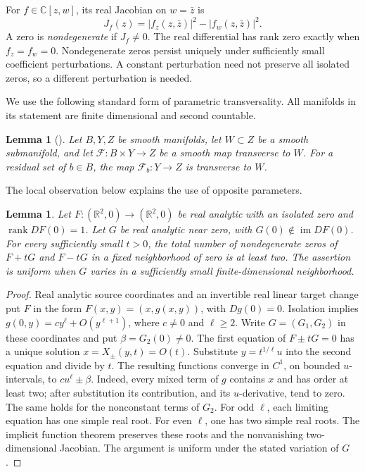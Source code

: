 \documentclass[a4paper]{amsart}
\newtheorem{lem}[thm]{Lemma}
\theoremstyle{remark}
\newcommand{\C}{\mathbb C}
\newcommand{\R}{\mathbb R}
\DeclareMathOperator{\rank}{rank}
\begin{document}
For \(f\in\C[z,w]\), its real Jacobian on \(w=\bar z\) is
\begin{equation}\label{eq:jacobian}
 J_f(z)=|f_z(z,\bar z)|^2-|f_w(z,\bar z)|^2.
\end{equation}
A zero is \emph{nondegenerate} if \(J_f\ne0\).
The real differential has rank zero exactly when \(f_z=f_w=0\).
Nondegenerate zeros persist uniquely under sufficiently small
coefficient perturbations. A constant perturbation need not
preserve all isolated zeros, so a different perturbation is needed.

We use the following standard form of parametric transversality.
All manifolds in its statement are finite dimensional and
second countable.

\begin{lem}[{\cite[Chapter 3, Section 2]{Hir76}}]\label{lem:transversality}
Let \(B,Y,Z\) be smooth manifolds, let \(W\subset Z\) be a
smooth submanifold, and let \(\mathcal F:B\times Y\to Z\)
be a smooth map transverse to \(W\).
For a residual set of \(b\in B\), the map
\(\mathcal F_b:Y\to Z\) is transverse to \(W\).
\end{lem}

The local observation below explains the use of opposite parameters.

\begin{lem}\label{lem:rankone}
Let \(F:(\R^2,0)\to(\R^2,0)\) be real analytic with an
isolated zero and \(\rank DF(0)=1\).
Let \(G\) be real analytic near zero, with
\(G(0)\notin\operatorname{im}DF(0)\).
For every sufficiently small \(t>0\), the total number of
nondegenerate zeros of \(F+tG\) and \(F-tG\) in a fixed
neighborhood of zero is at least two.
The assertion is uniform when \(G\) varies in a sufficiently
small finite-dimensional neighborhood.
\end{lem}

\begin{proof}
Real analytic source coordinates and an invertible real linear
target change put \(F\) in the form \(F(x,y)=(x,g(x,y))\), with
\(Dg(0)=0\). Isolation implies
\(g(0,y)=cy^\ell+O(y^{\ell+1})\), where \(c\ne0\) and \(\ell\ge2\).
Write \(G=(G_1,G_2)\) in these coordinates and put
\(\beta=G_2(0)\ne0\).
The first equation of \(F\pm tG=0\) has a unique solution
\(x=X_\pm(y,t)=O(t)\). Substitute \(y=t^{1/\ell}u\) into the
second equation and divide by \(t\). The resulting functions
converge in \(C^1\), on bounded \(u\)-intervals, to
\(cu^\ell\pm\beta\). Indeed, every mixed term of \(g\) contains
\(x\) and has order at least two; after substitution its
contribution, and its \(u\)-derivative, tend to zero.
The same holds for the nonconstant terms of \(G_2\).
For odd \(\ell\), each limiting equation has one simple real
root. For even \(\ell\), one has two simple real roots.
The implicit function theorem preserves these roots and the
nonvanishing two-dimensional Jacobian. The argument is uniform
under the stated variation of \(G\).
\end{proof}
\end{document}
